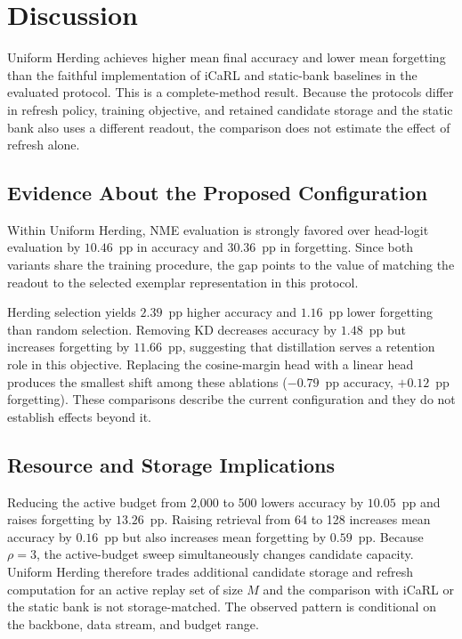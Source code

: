 \section{Discussion}
\label{sec:discussion}

Uniform Herding achieves higher mean final accuracy and lower mean forgetting
than the faithful implementation of iCaRL and static-bank baselines in the evaluated protocol.
This is a complete-method result. Because the protocols differ in refresh policy,
training objective, and retained candidate storage and the static bank also uses a different
readout, the comparison does not estimate the effect of refresh alone.

\subsection{Evidence About the Proposed Configuration}
\label{subsec:what-drives-performance}

Within Uniform Herding, NME evaluation is strongly favored over head-logit evaluation
by $10.46$~pp in accuracy and $30.36$~pp in forgetting.  Since both
variants share the training procedure, the gap points to the value of
matching the readout to the selected exemplar representation in this protocol.

Herding selection yields $2.39$~pp higher accuracy and $1.16$~pp lower
forgetting than random selection.  Removing KD decreases accuracy by
$1.48$~pp but increases forgetting by $11.66$~pp, suggesting that
distillation serves a retention role in this objective.  Replacing the
cosine-margin head with a linear head produces the smallest shift among
these ablations ($-0.79$~pp accuracy, $+0.12$~pp forgetting).  These
comparisons describe the current configuration and they do not establish effects beyond it.

\subsection{Resource and Storage Implications}
\label{subsec:resource-allocation}

Reducing the active budget from 2,000 to 500 lowers accuracy by $10.05$~pp and
raises forgetting by $13.26$~pp.  Raising retrieval from 64 to 128 increases
mean accuracy by $0.16$~pp but also increases mean forgetting by $0.59$~pp.
Because $\rho=3$, the active-budget sweep simultaneously changes candidate
capacity. Uniform Herding therefore trades additional candidate storage and
refresh computation for an active replay set of size $M$ and the comparison with
iCaRL or the static bank is not storage-matched.  The observed pattern
is conditional on the backbone, data stream, and budget range.

